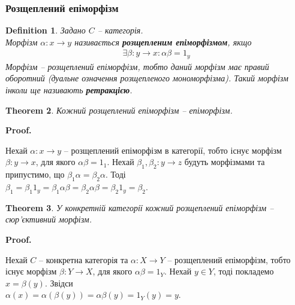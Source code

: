\documentclass[a4paper, 10pt]{article}
\makeatletter
\theoremstyle{theoremdd}
\newtheorem{theorem}{Theorem}[subsection]
\newtheorem{definition}[theorem]{Definition}
\renewenvironment{proof}[1][Proof.\\]{\par
\pushQED{\hfill \qed}%
\normalfont \topsep6\p@\@plus6\p@\relax
\trivlist
\item\relax
{\bfseries
#1\@addpunct{.}}\hspace\labelsep\ignorespaces
}{%
\popQED\endtrivlist\@endpefalse
}
\makeatother
\begin{document}
\subsubsection{Розщеплений епіморфізм}
\begin{definition}
Задано $C$ -- категорія.\\
Морфізм $\alpha \colon x \to y$ називається \textbf{розщепленим епіморфізмом}, якщо
\begin{align*}
\exists \beta \colon y \to x: \alpha \beta = 1_y
\end{align*}
Морфізм -- розщеплений епіморфізм, тобто даний морфізм має правий оборотний (дуальне означення розщепленого мономорфізма). Такий морфізм інколи ще називають \textbf{ретракцією}.
\begin{figure}[H]
\centering
{}
\end{figure}
\end{definition}

\begin{theorem}
Кожний розщеплений епіморфізм -- епіморфізм.
\end{theorem}

\begin{proof}
Нехай $\alpha \colon x \to y$ -- розщеплений епіморфізм в категорії, тобто існує морфізм $\beta \colon y \to x$, для якого $\alpha \beta = 1_1$. Нехай $\beta_1,\beta_2 \colon y \to z$ будуть морфізмами та припустимо, що $\beta_1 \alpha = \beta_2 \alpha$. Тоді \\
$\beta_1 = \beta_1 1_y = \beta_1 \alpha \beta = \beta_2 \alpha \beta = \beta_2 1_y = \beta_2$.
\end{proof}

\begin{theorem}
У конкретній категорії кожний розщеплений епіморфізм -- сюр'єктивний морфізм.
\end{theorem}

\begin{proof}
Нехай $C$ -- конкретна категорія та $\alpha \colon X \to Y$ -- розщеплений епіморфізм, тобто існує морфізм $\beta \colon Y \to X$, для якого $\alpha \beta = 1_Y$. Нехай $y \in Y$, тоді покладемо $x = \beta(y)$. Звідси\\
$\alpha(x) = \alpha(\beta(y)) = \alpha \beta(y) = 1_Y(y) = y$.
\end{proof}
\end{document}

